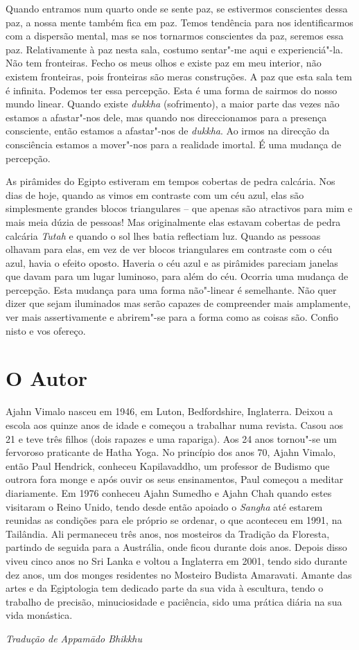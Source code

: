 Quando entramos num quarto onde se sente paz, se estivermos conscientes
dessa paz, a nossa mente também fica em paz. Temos tendência para nos
identificarmos com a dispersão mental, mas se nos tornarmos conscientes
da paz, seremos essa paz. Relativamente à paz nesta sala, costumo
sentar"-me aqui e experienciá"-la. Não tem fronteiras. Fecho os meus olhos
e existe paz em meu interior, não existem fronteiras, pois fronteiras
são meras construções. A paz que esta sala tem é infinita. Podemos ter
essa percepção. Esta é uma forma de sairmos do nosso mundo linear.
Quando existe \emph{dukkha} (sofrimento), a maior parte das vezes não
estamos a afastar"-nos dele, mas quando nos direccionamos para a presença
consciente, então estamos a afastar"-nos de \emph{dukkha}. Ao irmos na
direcção da consciência estamos a mover"-nos para a realidade imortal. É
uma mudança de percepção.

As pirâmides do Egipto estiveram em tempos cobertas de pedra calcária.
Nos dias de hoje, quando as vimos em contraste com um céu azul, elas são
simplesmente grandes blocos triangulares -- que apenas são atractivos
para mim e mais meia dúzia de pessoas! Mas originalmente elas estavam
cobertas de pedra calcária \emph{Tutah} e quando o sol lhes batia
reflectiam luz. Quando as pessoas olhavam para elas, em vez de ver
blocos triangulares em contraste com o céu azul, havia o efeito oposto.
Haveria o céu azul e as pirâmides pareciam janelas que davam para um
lugar luminoso, para além do céu. Ocorria uma mudança de percepção. Esta
mudança para uma forma não"-linear é semelhante. Não quer dizer que sejam
iluminados mas serão capazes de compreender mais amplamente, ver mais
assertivamente e abrirem"-se para a forma como as coisas são. Confio
nisto e vos ofereço.

\section{O Autor}
 
Ajahn Vimalo nasceu em 1946, em Luton, Bedfordshire, Inglaterra. Deixou
a escola aos quinze anos de idade e começou a trabalhar numa revista.
Casou aos 21 e teve três filhos (dois rapazes e uma rapariga). Aos 24
anos tornou"-se um fervoroso praticante de Hatha Yoga. No princípio dos
anos 70, Ajahn Vimalo, então Paul Hendrick, conheceu Kapilavaddho, um
professor de Budismo que outrora fora monge e após ouvir os seus
ensinamentos, Paul começou a meditar diariamente. Em 1976 conheceu Ajahn
Sumedho e Ajahn Chah quando estes visitaram o Reino Unido, tendo desde
então apoiado o \emph{Sangha} até estarem reunidas as condições para ele
próprio se ordenar, o que aconteceu em 1991, na Tailândia. Ali
permaneceu três anos, nos mosteiros da Tradição da Floresta, partindo de
seguida para a Austrália, onde ficou durante dois anos. Depois disso
viveu cinco anos no Sri Lanka e voltou a Inglaterra em 2001, tendo sido
durante dez anos, um dos monges residentes no Mosteiro Budista
Amaravati. Amante das artes e da Egiptologia tem dedicado parte da sua
vida à escultura, tendo o trabalho de precisão, minuciosidade e
paciência, sido uma prática diária na sua vida monástica.

\bigskip

{\raggedleft\itshape
  Tradução de Appamādo Bhikkhu
\par}

